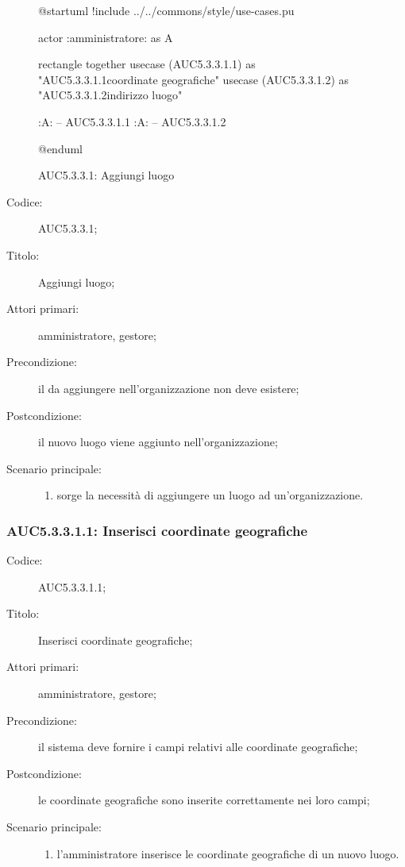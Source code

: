 \begin{figure}[H]
  \centering
  \begin{plantuml}
  @startuml
  !include ../../commons/style/use-cases.pu

  actor :amministratore: as A

  rectangle {
    together {
      usecase (AUC5.3.3.1.1) as "AUC5.3.3.1.1\nInserisci coordinate geografiche"
      usecase (AUC5.3.3.1.2) as "AUC5.3.3.1.2\nInserisci indirizzo luogo"
    }
  }

  :A: -- AUC5.3.3.1.1
  :A: -- AUC5.3.3.1.2

  @enduml
  \end{plantuml}
  \caption{AUC5.3.3.1: Aggiungi luogo}%
  \label{fig:AUC5_3_3_1}
\end{figure}

\begin{description}
  \item[Codice:] AUC5.3.3.1;
  \item[Titolo:] Aggiungi luogo;
  \item[Attori primari:] amministratore, gestore;
  \item[Precondizione:] il  da aggiungere nell'organizzazione non deve esistere;
  \item[Postcondizione:] il nuovo luogo viene aggiunto nell'organizzazione;
  \item[Scenario principale:]
  \begin{enumerate}
    \item sorge la necessità di aggiungere un luogo ad un'organizzazione.
  \end{enumerate}
\end{description}

\subsubsection{AUC5.3.3.1.1: Inserisci coordinate geografiche}%
\label{subs:AUC5.3.3.1.1}
\begin{description}
  \item[Codice:] AUC5.3.3.1.1;
  \item[Titolo:] Inserisci coordinate geografiche;
  \item[Attori primari:] amministratore, gestore;
  \item[Precondizione:] il sistema deve fornire i campi relativi alle coordinate geografiche;
  \item[Postcondizione:] le coordinate geografiche sono inserite correttamente nei loro campi;
  \item[Scenario principale:]
  \begin{enumerate}
    \item l'amministratore inserisce le coordinate geografiche di un nuovo luogo.
  \end{enumerate}
\end{description}

